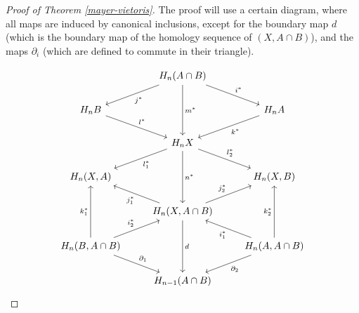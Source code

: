 \begin{proof}[Proof of Theorem \ref{mayer-vietoris}]
The proof will use a certain diagram, where all maps are induced by canonical inclusions, except for the boundary map $d$ (which is the boundary map of the homology sequence of $(X,A\cap B)$), and the maps $\partial_i$ (which are defined to commute in their triangle).

\[\begin{tikzcd}
                                                                                  & H_n(A\cap B) \arrow[ld, "j^*"] \arrow[rd, "i^*"] \arrow[dd, "m^*"]       &                                                                                   \\
H_nB \arrow[rd, "l^*"]                                                            &                                                                          & H_nA \arrow[ld, "k^*"]                                                            \\
                                                                                  & H_n X \arrow[ld, "l_1^*"] \arrow[rd, "l_2^*"] \arrow[dd, "n^*"]          &                                                                                   \\
{H_n(X,A)}                                                                        &                                                                          & {H_n(X,B)}                                                                        \\
                                                                                  & {H_n(X,A\cap B)} \arrow[ru, "j_2^*"] \arrow[lu, "j_1^*"] \arrow[dd, "d"] &                                                                                   \\
{H_n(B,A\cap B)} \arrow[uu, "k_1^*"] \arrow[ru, "i_2^*"] \arrow[rd, "\partial_1"] &                                                                          & {H_n(A,A\cap B)} \arrow[uu, "k_2^*"] \arrow[lu, "i_1^*"] \arrow[ld, "\partial_2"] \\
                                                                                  & H_{n-1}(A\cap B)                                                         &                                                                                  
\end{tikzcd}\]


\end{proof}
